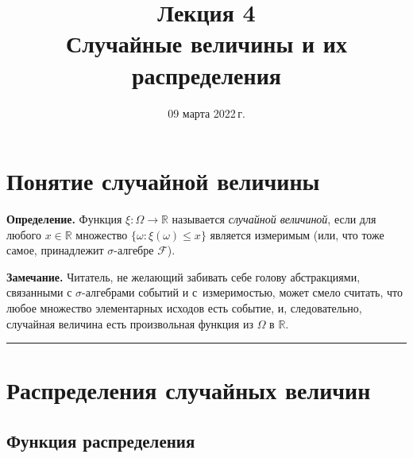 \documentclass[11pt,a4paper]{article}
\title{
      {\Large Лекция 4} \\
      Случайные величины и их распределения
    }
\date{09 марта 2022\,г.}
\begin{document}
    
  \maketitle
  \thispagestyle{empty}
  \tableofcontents
  \pagebreak



    \hypertarget{ux43fux43eux43dux44fux442ux438ux435-ux441ux43bux443ux447ux430ux439ux43dux43eux439-ux432ux435ux43bux438ux447ux438ux43dux44b}{%
\section{Понятие случайной
величины}\label{ux43fux43eux43dux44fux442ux438ux435-ux441ux43bux443ux447ux430ux439ux43dux43eux439-ux432ux435ux43bux438ux447ux438ux43dux44b}}

\textbf{Определение.} Функция \(\xi: \Omega \rightarrow \mathbb{R}\)
называется \emph{случайной величиной}, если для любого
\(x \in \mathbb{R}\) множество \(\{\omega : \xi(\omega) \le x\}\)
является измеримым (или, что тоже самое, принадлежит \(\sigma\)-алгебре
\(\mathcal{F}\)).

\textbf{Замечание.} Читатель, не желающий забивать себе голову абстракциями, связанными с \(\sigma\)-алгебрами событий и с~измеримостью, может смело считать, что любое множество элементарных исходов есть событие, и, следовательно, случайная величина есть произвольная функция из \(\Omega\) в \(\mathbb{R}\).


\begin{center}\rule{0.5\linewidth}{0.5pt}\end{center}

\hypertarget{ux440ux430ux441ux43fux440ux435ux434ux435ux43bux435ux43dux438ux44f-ux441ux43bux443ux447ux430ux439ux43dux44bux445-ux432ux435ux43bux438ux447ux438ux43d}{%
\section{Распределения случайных
величин}\label{ux440ux430ux441ux43fux440ux435ux434ux435ux43bux435ux43dux438ux44f-ux441ux43bux443ux447ux430ux439ux43dux44bux445-ux432ux435ux43bux438ux447ux438ux43d}}

\hypertarget{ux444ux443ux43dux43aux446ux438ux44f-ux440ux430ux441ux43fux440ux435ux434ux435ux43bux435ux43dux438ux44f}{%
\subsection{Функция
распределения}\label{ux444ux443ux43dux43aux446ux438ux44f-ux440ux430ux441ux43fux440ux435ux434ux435ux43bux435ux43dux438ux44f}}
\end{document}
